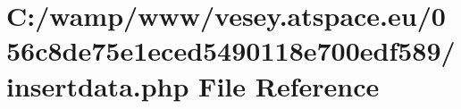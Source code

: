 \hypertarget{056c8de75e1eced5490118e700edf589_2insertdata_8php}{\section{C\-:/wamp/www/vesey.atspace.\-eu/056c8de75e1eced5490118e700edf589/insertdata.php File Reference}
\label{056c8de75e1eced5490118e700edf589_2insertdata_8php}
}
